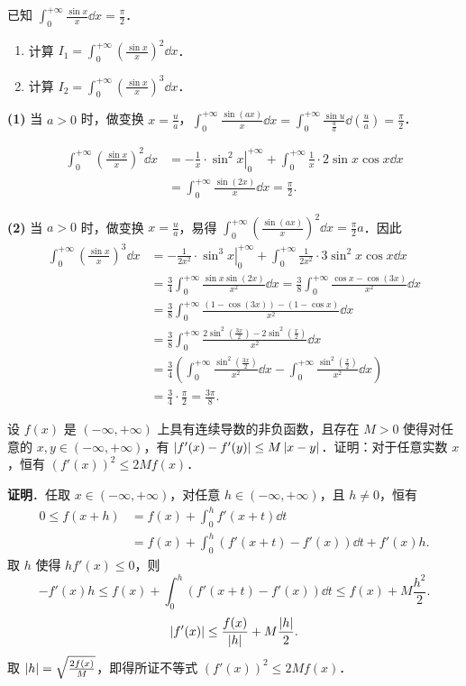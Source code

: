 已知 $\displaystyle \int_0^{+\infty}\frac{\sin x}{x}\dd x=\frac{\pi}{2}$．
\begin{enumerate}[label=(\arabic*)]
  \item 计算 $\displaystyle I_1=\int_0^{+\infty}\left(\frac{\sin x}{x}\right)^2\dd x$．
  \item 计算 $\displaystyle I_2=\int_0^{+\infty}\left(\frac{\sin x}{x}\right)^3\dd x$．
\end{enumerate}
\begin{solution}
\textbf{(1)} 当 $a>0$ 时，做变换 $x=\frac{u}{a}$，$\displaystyle \int_0^{+\infty}\frac{\sin(ax)}{x}\dd x=\int_0^{+\infty}\frac{\sin u}{\frac{u}{a}}\dd\left(\frac{u}{a}\right)=\frac{\pi}{2}$．

\begin{align*}
  \int_0^{+\infty}\left(\frac{\sin x}{x}\right)^2\dd x
  &=\left.-\frac{1}{x}\cdot\sin^2x\right|_{0}^{+\infty}+\int_0^{+\infty}\frac{1}{x}\cdot2\sin x\cos x\dd x\\
  &=\int_0^{+\infty}\frac{\sin(2x)}{x}\dd x=\frac{\pi}{2}.
\end{align*}

\textbf{(2)} 当 $a>0$ 时，做变换 $x=\frac{u}{a}$，易得 $\displaystyle \int_0^{+\infty}\left(\frac{\sin(ax)}{x}\right)^2\dd x=\frac{\pi}{2}a$．因此
\begin{align*}
  \int_0^{+\infty}\left(\frac{\sin x}{x}\right)^3\dd x
  &=\left.-\frac{1}{2x^2}\cdot\sin^3x\right|_{0}^{+\infty}+\int_0^{+\infty}\frac{1}{2x^2}\cdot3\sin^2x\cos x\dd x\\
  &=\frac{3}{4}\int_0^{+\infty}\frac{\sin x\sin(2x)}{x^2}\dd x
   =\frac{3}{8}\int_0^{+\infty}\frac{\cos x-\cos(3x)}{x^2}\dd x\\
  &=\frac{3}{8}\int_0^{+\infty}\frac{(1-\cos(3x))-(1-\cos x)}{x^2}\dd x\\
  &=\frac{3}{8}\int_0^{+\infty}\frac{2\sin^2\left(\frac{3x}{2}\right)-2\sin^2\left(\frac{x}{2}\right)}{x^2}\dd x\\
  &=\frac{3}{4}\left(\int_0^{+\infty}\frac{\sin^2\left(\frac{3x}{2}\right)}{x^2}\dd x-\int_0^{+\infty}\frac{\sin^2\left(\frac{x}{2}\right)}{x^2}\dd x\right)\\
  &=\frac{3}{4}\cdot\frac{\pi}{2}=\frac{3\pi}{8}.
\end{align*}
\end{solution}

设 $f(x)$ 是 $(-\infty,+\infty)$ 上具有连续导数的非负函数，且存在 $M>0$ 使得对任意的 $x,y\in(-\infty,+\infty)$，有 $\left|f'(x)-f'(y)\right|\le M\left|x-y\right|$．证明：对于任意实数 $x$，恒有 $(f'(x))^2\le 2Mf(x)$．
\begin{solution}
\textbf{证明}．任取 $x\in(-\infty,+\infty)$，对任意 $h\in(-\infty,+\infty)$，且 $h\ne 0$，恒有
\begin{align*}
  0\le f(x+h)&=f(x)+\int_0^h f'(x+t)\dd t\\
  &=f(x)+\int_0^h(f'(x+t)-f'(x))\dd t+f'(x)h.
\end{align*}
取 $h$ 使得 $hf'(x)\le 0$，则
\[
  -f'(x)h\le f(x)+\int_0^h(f'(x+t)-f'(x))\dd t\le f(x)+M\frac{h^2}{2}.
\]
\[
  \left|f'(x)\right|\le\frac{f(x)}{\left|h\right|}+M\frac{\left|h\right|}{2}.
\]
取 $\left|h\right|=\sqrt{\frac{2f(x)}{M}}$，即得所证不等式 $(f'(x))^2\le 2Mf(x)$．
\end{solution}
